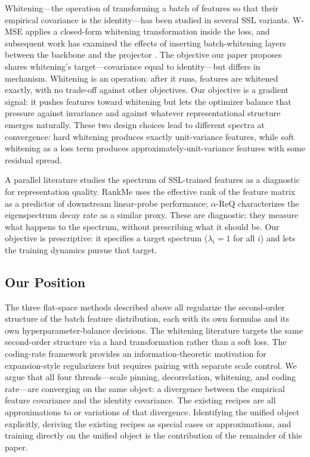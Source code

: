 Whitening---the operation of transforming a batch of features so that their empirical covariance is the identity---has been studied in several SSL variants. W-MSE \citep{ermolov2021wmse} applies a closed-form whitening transformation inside the loss, and subsequent work has examined the effects of inserting batch-whitening layers between the backbone and the projector \citep{hua2021shuffled}. The objective our paper proposes shares whitening's target---covariance equal to identity---but differs in mechanism. Whitening is an operation: after it runs, features are whitened exactly, with no trade-off against other objectives. Our objective is a gradient signal: it pushes features toward whitening but lets the optimizer balance that pressure against invariance and against whatever representational structure emerges naturally. These two design choices lead to different spectra at convergence: hard whitening produces exactly unit-variance features, while soft whitening as a loss term produces approximately-unit-variance features with some residual spread.

A parallel literature studies the spectrum of SSL-trained features as a diagnostic for representation quality. RankMe \citep{garrido2023rankme} uses the effective rank of the feature matrix as a predictor of downstream linear-probe performance; $\alpha$-ReQ \citep{agrawal2022alphareq} characterizes the eigenspectrum decay rate as a similar proxy. These are diagnostic: they measure what happens to the spectrum, without prescribing what it should be. Our objective is prescriptive: it specifies a target spectrum ($\lambda_i = 1$ for all $i$) and lets the training dynamics pursue that target.

\subsection{Our Position}

The three flat-space methods described above all regularize the second-order structure of the batch feature distribution, each with its own formulas and its own hyperparameter-balance decisions. The whitening literature targets the same second-order structure via a hard transformation rather than a soft loss. The coding-rate framework provides an information-theoretic motivation for expansion-style regularizers but requires pairing with separate scale control. We argue that all four threads---scale pinning, decorrelation, whitening, and coding rate---are converging on the same object: a divergence between the empirical feature covariance and the identity covariance. The existing recipes are all approximations to or variations of that divergence. Identifying the unified object explicitly, deriving the existing recipes as special cases or approximations, and training directly on the unified object is the contribution of the remainder of this paper.
